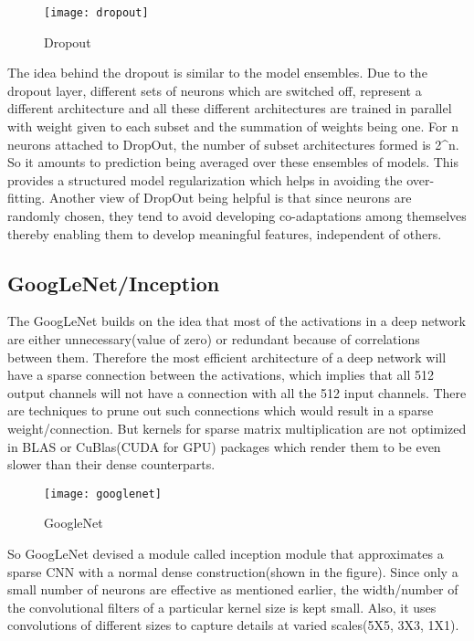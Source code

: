 \documentclass[../main.tex]{subfiles}
\begin{document}
\begin{figure}[htbp] 
\centering 
\texttt{[image: dropout]}
\caption{Dropout} 
\label{dropout} 
\end{figure}
The idea behind the dropout is similar to the model ensembles. Due to the dropout layer, different sets of neurons which are switched off, represent a different architecture and all these different architectures are trained in parallel with weight given to each subset and the summation of weights being one. For n neurons attached to DropOut, the number of subset architectures formed is 2^n. So it amounts to prediction being averaged over these ensembles of models. This provides a structured model regularization which helps in avoiding the over-fitting. Another view of DropOut being helpful is that since neurons are randomly chosen, they tend to avoid developing co-adaptations among themselves thereby enabling them to develop meaningful features, independent of others.

\subsection{GoogLeNet/Inception}
The GoogLeNet builds on the idea that most of the activations in a deep network are either unnecessary(value of zero) or redundant because of correlations between them. Therefore the most efficient architecture of a deep network will have a sparse connection between the activations, which implies that all 512 output channels will not have a connection with all the 512 input channels. There are techniques to prune out such connections which would result in a sparse weight/connection. But kernels for sparse matrix multiplication are not optimized in BLAS or CuBlas(CUDA for GPU) packages which render them to be even slower than their dense counterparts.

\begin{figure}[htbp] 
\centering 
\texttt{[image: googlenet]}
\caption{GoogleNet} 
\label{https://stackoverflow.com/questions/47633393/how-to-calculate-the-number-of-layer-for-googlenet} 
\end{figure}
So GoogLeNet devised a module called inception module that approximates a sparse CNN with a normal dense construction(shown in the figure). Since only a small number of neurons are effective as mentioned earlier, the width/number of the convolutional filters of a particular kernel size is kept small. Also, it uses convolutions of different sizes to capture details at varied scales(5X5, 3X3, 1X1).
\end{document}
